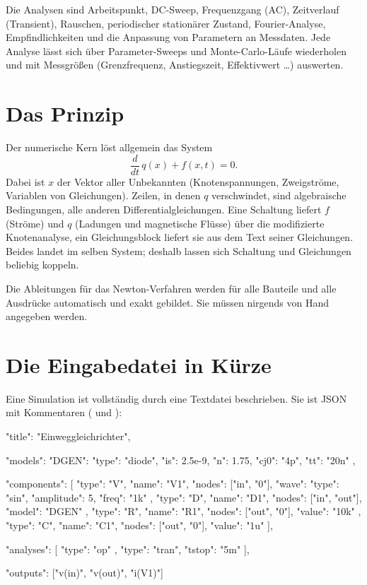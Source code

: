 Die Analysen sind Arbeitspunkt, DC-Sweep, Frequenzgang (AC), Zeitverlauf
(Transient), Rauschen, periodischer stationärer Zustand, Fourier-Analyse,
Empfindlichkeiten und die Anpassung von Parametern an Messdaten. Jede
Analyse lässt sich über Parameter-Sweeps und Monte-Carlo-Läufe wiederholen
und mit Messgrößen (Grenzfrequenz, Anstiegszeit, Effektivwert …)
auswerten.

\section{Das Prinzip}

Der numerische Kern löst allgemein das System
\[
  \frac{d}{dt}\,q(x) + f(x,t) = 0 .
\]
Dabei ist $x$ der Vektor aller Unbekannten (Knotenspannungen, Zweigströme,
Variablen von Gleichungen). Zeilen, in denen $q$ verschwindet, sind
algebraische Bedingungen, alle anderen Differentialgleichungen. Eine
Schaltung liefert $f$ (Ströme) und $q$ (Ladungen und magnetische Flüsse)
über die modifizierte Knotenanalyse, ein Gleichungsblock liefert sie aus dem
Text seiner Gleichungen. Beides landet im selben System; deshalb lassen sich
Schaltung und Gleichungen beliebig koppeln.

Die Ableitungen für das Newton-Verfahren werden für alle Bauteile und alle
Ausdrücke automatisch und exakt gebildet. Sie müssen nirgends von Hand
angegeben werden.

\section{Die Eingabedatei in Kürze}

Eine Simulation ist vollständig durch eine Textdatei beschrieben. Sie ist
JSON mit Kommentaren (\code{//} und \code{/* */}):

\begin{json}
{
  "title": "Einweggleichrichter",

  "models": {
    "DGEN": { "type": "diode", "is": 2.5e-9, "n": 1.75, "cj0": "4p", "tt": "20n" }
  },

  "components": [
    { "type": "V", "name": "V1", "nodes": ["in", "0"],
      "wave": { "type": "sin", "amplitude": 5, "freq": "1k" } },
    { "type": "D", "name": "D1", "nodes": ["in", "out"], "model": "DGEN" },
    { "type": "R", "name": "R1", "nodes": ["out", "0"], "value": "10k" },
    { "type": "C", "name": "C1", "nodes": ["out", "0"], "value": "1u" }
  ],

  "analyses": [
    { "type": "op" },
    { "type": "tran", "tstop": "5m" }
  ],

  "outputs": ["v(in)", "v(out)", "i(V1)"]
}
\end{json}

